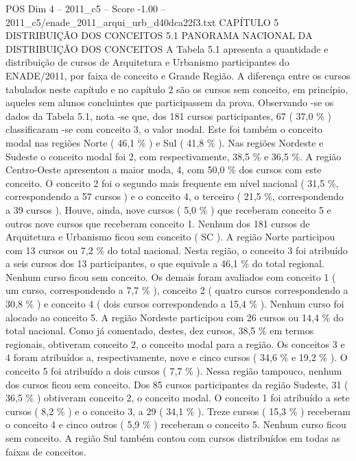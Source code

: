 \begin{textsample}{POS Dim 4 – 2011\_c5 – Score -1.00 – 2011\_c5/enade\_2011\_arqui\_urb\_d40dca22f3.txt}  \label{ex:f4_pos_247}
CAPÍTULO 5 DISTRIBUIÇÃO DOS CONCEITOS 5.1 PANORAMA NACIONAL DA DISTRIBUIÇÃO DOS CONCEITOS A Tabela 5.1 apresenta a quantidade e distribuição de cursos de Arquitetura e Urbanismo participantes do ENADE/2011, por faixa de conceito e Grande Região.
A diferença entre os cursos tabulados neste capítulo e no capítulo 2 são os cursos sem conceito, em princípio, aqueles sem alunos concluintes que participassem da prova.
Observando -se os dados da Tabela 5.1, nota -se que, dos 181 cursos participantes, 67 ( 37,0 \% ) classificaram -se com conceito 3, o valor modal.
Este foi também o conceito modal nas regiões Norte ( 46,1 \% ) e Sul ( 41,8 \% ).
Nas regiões Nordeste e Sudeste o conceito modal foi 2, com respectivamente, 38,5 \% e 36,5 \%.
A região Centro-Oeste apresentou a maior moda, 4, com 50,0 \% dos cursos com este conceito.
O conceito 2 foi o segundo mais frequente em nível nacional ( 31,5 \%, correspondendo a 57 cursos ) e o conceito 4, o terceiro ( 21,5 \%, correspondendo a 39 cursos ).
Houve, ainda, nove cursos ( 5,0 \% ) que receberam conceito 5 e outros nove cursos que receberam conceito 1.
Nenhum dos 181 cursos de Arquitetura e Urbanismo ficou sem conceito ( SC ).
A região Norte participou com 13 cursos ou 7,2 \% do total nacional.
Nesta região, o conceito 3 foi atribuído a seis cursos dos 13 participantes, o que equivale a 46,1 \% do total regional.
Nenhum curso ficou sem conceito.
Os demais foram avaliados com conceito 1 ( um curso, correspondendo a 7,7 \% ), conceito 2 ( quatro cursos correspondendo a 30,8 \% ) e conceito 4 ( dois cursos correspondendo a 15,4 \% ).
Nenhum curso foi alocado ao conceito 5.
A região Nordeste participou com 26 cursos ou 14,4 \% do total nacional.
Como já comentado, destes, dez cursos, 38,5 \% em termos regionais, obtiveram conceito 2, o conceito modal para a região.
Os conceitos 3 e 4 foram atribuídos a, respectivamente, nove e cinco cursos ( 34,6 \% e 19,2 \% ).
O conceito 5 foi atribuído a dois cursos ( 7,7 \% ).
Nessa região tampouco, nenhum dos cursos ficou sem conceito.
Dos 85 cursos participantes da região Sudeste, 31 ( 36,5 \% ) obtiveram conceito 2, o conceito modal.
O conceito 1 foi atribuído a sete cursos ( 8,2 \% ) e o conceito 3, a 29 ( 34,1 \% ).
Treze cursos ( 15,3 \% ) receberam o conceito 4 e cinco outros ( 5,9 \% ) receberam o conceito 5.
Nenhum curso ficou sem conceito.
A região Sul também contou com cursos distribuídos em todas as faixas de conceitos.

\end{textsample}
